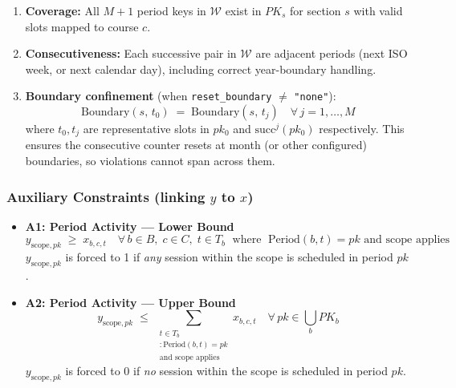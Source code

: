 \documentclass{article}
\begin{document}
\begin{enumerate}
    \item \textbf{Coverage:} All $M+1$ period keys in $\mathcal{W}$ exist in $PK_s$ for section $s$ with valid slots mapped to course $c$.
    \item \textbf{Consecutiveness:} Each successive pair in $\mathcal{W}$ are adjacent periods (next ISO week, or next calendar day), including correct year-boundary handling.
    \item \textbf{Boundary confinement} (when \texttt{reset\_boundary} $\neq$ \texttt{"none"}):
    \begin{equation}
        \mathrm{Boundary}(s,\,t_0) \;=\; \mathrm{Boundary}(s,\,t_j)
        \quad \forall\, j = 1,\ldots,M
    \end{equation}
    where $t_0, t_j$ are representative slots in $pk_0$ and $\mathrm{succ}^j(pk_0)$ respectively. This ensures the consecutive counter resets at month (or other configured) boundaries, so violations cannot span across them.
\end{enumerate}

\subsubsection*{Auxiliary Constraints (linking $y$ to $x$)}

\begin{itemize}
    \item \textbf{A1: Period Activity — Lower Bound}
    \begin{equation}
        y_{\mathrm{scope},pk} \;\geq\; x_{b,c,t}
        \quad \forall\, b \in B,\; c \in C,\; t \in T_b
        \;\text{ where }\; \mathrm{Period}(b,t) = pk\text{ and scope applies}
    \end{equation}
    $y_{\mathrm{scope},pk}$ is forced to 1 if \emph{any} session within the scope is scheduled in period $pk$.

    \item \textbf{A2: Period Activity — Upper Bound}
    \begin{equation}
        y_{\mathrm{scope},pk} \;\leq\; \sum_{\substack{t \in T_b\\:\mathrm{Period}(b,t)=pk\\\text{and scope applies}}} x_{b,c,t}
        \quad \forall\, pk \in \bigcup_b PK_b
    \end{equation}
    $y_{\mathrm{scope},pk}$ is forced to 0 if \emph{no} session within the scope is scheduled in period $pk$.
\end{itemize}
\end{document}
